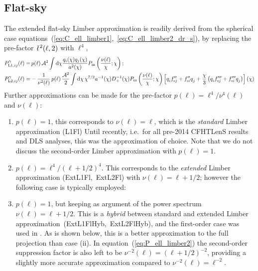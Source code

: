 \documentclass[fleqn,usenatbib]{mnras} %
\newcommand{\ellbar}{\hbox{\it \l}\,}
\newcommand{\pref}{{\cal A}}
\newcommand{\LabelTxt}[1]{(\mbox{#1})}
\begin{document}
\subsection{Flat-sky}
\label{sec:Limber_flat_sky}

The extended flat-sky Limber approximation is readily derived from the
spherical case equations~(\ref{eq:C_ell_limber1},~\ref{eq:C_ell_limber2_dr_s}), by
replacing the pre-factor $\ellbar^2(\ell, 2)$ with $\ell^4$,
%
\begin{align}
  P^\gamma_{{\rm L1}, ij}(\ell) = & \, p(\ell) \, \pref^2 \int {\rm d} \chi \frac{ q_i(\chi) q_j(\chi) }{a^2(\chi)}
  P_{\rm m}\left(\frac{\nu(\ell)}{\chi}; \chi\right);
  \label{eq:P_ell_limber1}
  \\
    P^\gamma_{{\rm L2}, ij}(\ell) = & - \frac 1 {\nu^2(\ell)} \, p(\ell) \, \frac{\pref^2}{2}
    \int {\rm d} \chi \, \chi^{7/2} a^{-1}(\chi) D_+^{-1}(\chi) P_{\rm m}\left(\frac{\nu(\ell)}\chi; \chi\right)
    \left[ q^{}_i f^{\prime\prime}_{{\rm s}j} + f^{\prime\prime}_{{\rm s}i} q^{}_j  
      + \frac{\chi}{3} \left( q^{}_i f^{\prime\prime\prime}_{{\rm s}j} + f^{\prime\prime\prime}_{{\rm s}i} q^{}_j
      \right)
    \right](\chi)
  \label{eq:P_ell_limber2}
\end{align}
%
Further approximations can be made for the pre-factor $p(\ell) = \ell^4/\nu^4(\ell)$ and $\nu(\ell)$:
%
\begin{enumerate}
  \item $p(\ell) = 1$, this corresponds to $\nu(\ell) = \ell$, which is the
    \emph{standard} Limber approximation \LabelTxt{L1Fl} Until recently,
  i.e.~for all pre-2014 CFHTLenS results and DLS
  \citep{jee/etal:2016} analyses, this was the approximation of choice. Note that
  we do not discuss the second-order Limber approximation with $p(\ell)=1$.
  \item $p(\ell) = \ell^4/(\ell + 1/2)^4$. This corresponds to the
  \emph{extended} Limber approximation \LabelTxt{ExtL1Fl, ExtL2Fl} with
  $\nu(\ell) = \ell + 1/2$; however the following case is typically employed:
  \item $p(\ell) = 1$, but keeping as argument of the power spectrum $\nu(\ell) = \ell + 1/2$. This is
    a \emph{hybrid} between
    standard and extended Limber approximation~\LabelTxt{ExtL1FlHyb, ExtL2FlHyb}, and the first-order case 
    was used in \cite{KiDS-450,joudaki/etal:2016,joudaki/etal:2017,abbott/etal:2016}. As is shown
    below, this is a better approximation to the full projection than case (ii). In equation~(\ref{eq:P_ell_limber2})
    the second-order suppression factor is also left to be $\nu^{-2}(\ell) = (\ell + 1/2)^{-2}$, providing
    a slightly more accurate approximation compared to $\nu^{-2}(\ell) = \ell^{-2}$.
\end{enumerate}
\end{document}
